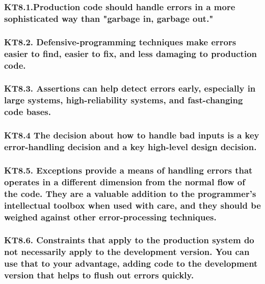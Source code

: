 \documentclass[12pt]{report}
\begin{document}
\subsubsection{KT8.1.Production code should handle errors in a more sophisticated way than "garbage in, garbage out."}

\subsubsection{KT8.2. Defensive-programming techniques make errors easier to find, easier to fix, and less damaging to production code.}

\subsubsection{KT8.3. Assertions can help detect errors early, especially in large systems, high-reliability systems, and fast-changing code bases.}

\subsubsection{KT8.4 The decision about how to handle bad inputs is a key error-handling decision and a key high-level design decision.}

\subsubsection{KT8.5. Exceptions provide a means of handling errors that operates in a different dimension from the normal flow of the code. They are a valuable addition to the programmer's intellectual toolbox when used with care, and they should be weighed against other error-processing techniques.}

\subsubsection{KT8.6. Constraints that apply to the production system do not necessarily apply to the development version. You can use that to your advantage, adding code to the development version that helps to flush out errors quickly.}
\end{document}
